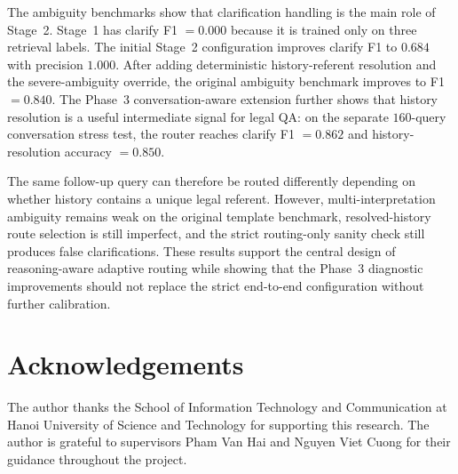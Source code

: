\documentclass[11pt,twocolumn]{article}
\begin{document}
The ambiguity benchmarks show that clarification handling is
the main role of Stage~2. Stage~1 has clarify F1 $=0.000$
because it is trained only on three retrieval labels. The
initial Stage~2 configuration improves clarify F1 to $0.684$
with precision $1.000$. After adding deterministic
history-referent resolution and the severe-ambiguity override,
the original ambiguity benchmark improves to F1 $=0.840$.
The Phase~3 conversation-aware extension further shows that
history resolution is a useful intermediate signal for legal
QA: on the separate $160$-query conversation stress test, the
router reaches clarify F1 $=0.862$ and history-resolution
accuracy $=0.850$.

The same follow-up query can therefore be routed differently
depending on whether history contains a unique legal referent.
However, multi-interpretation ambiguity remains weak on the
original template benchmark, resolved-history route selection
is still imperfect, and the strict routing-only sanity check
still produces false clarifications. These results support the
central design of reasoning-aware adaptive routing while
showing that the Phase~3 diagnostic improvements should not
replace the strict end-to-end configuration without further
calibration.

\section*{Acknowledgements}

The author thanks the School of Information Technology and
Communication at Hanoi University of Science and Technology
for supporting this research. The author is grateful to
supervisors Pham Van Hai and Nguyen Viet Cuong for their
guidance throughout the project.



\end{document}
